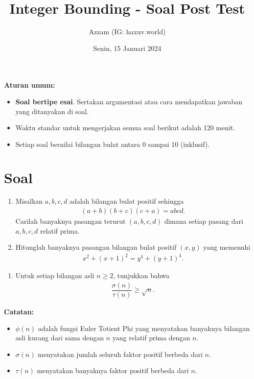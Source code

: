 \documentclass[12pt]{scrartcl}
\title{Integer Bounding - Soal Post Test}
\author{Azzam (IG: haxuv.world)}
\date{Senin, 15 Januari 2024}
\begin{document}
\maketitle

\renewcommand*\contentsname{Daftar Isi}
\tableofcontents

\newpage
\textbf{Aturan umum:}
\begin{itemize}
    \item \textbf{Soal bertipe esai}. Sertakan argumentasi atau cara mendapatkan jawaban yang ditanyakan di soal.
    \item Waktu standar untuk mengerjakan semua soal berikut adalah 120 menit.
    \item Setiap soal bernilai bilangan bulat antara 0 sampai 10 (inklusif).
\end{itemize}

\section{Soal}
\begin{enumerate}
    \item Misalkan $a,b,c,d$ adalah bilangan bulat positif sehingga
    \begin{align*}
        (a+b)(b+c)(c+a) = abcd.
    \end{align*}
    Carilah banyaknya pasangan terurut $(a,b,c,d)$ dimana setiap pasang dari $a,b,c,d$ relatif prima.
    
    \item Hitunglah banyaknya pasangan bilangan bulat positif $(x,y)$ yang memenuhi
    \begin{align*}
        x^2+(x+1)^2 = y^4 + (y+1)^4.
    \end{align*}
\end{enumerate}

\begin{enumerate}[resume]
    \item Untuk setiap bilangan asli $n \ge 2$, tunjukkan bahwa
    \begin{align*}
        \dfrac{\sigma(n)}{\tau(n)} \ge \sqrt{n}.
    \end{align*}
\end{enumerate}

\textbf{Catatan:}
\begin{itemize}
    \item $\phi(n)$ adalah fungsi Euler Totient Phi yang menyatakan banyaknya bilangan asli kurang dari sama dengan $n$ yang relatif prima dengan $n$.
    \item $\sigma(n)$ menyatakan jumlah seluruh faktor positif berbeda dari $n$.
    \item $\tau(n)$ menyatakan banyaknya faktor positif berbeda dari $n$.
\end{itemize}
\end{document}
